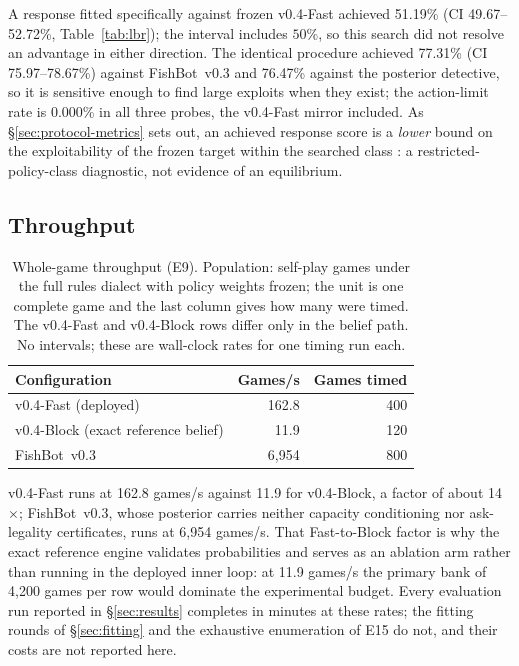 \documentclass[11pt]{article}
\theoremstyle{definition}
\DeclareRobustCommand{\vfast}{\texorpdfstring{\mbox{v0.4-Fast}}{v0.4-Fast}}
\DeclareRobustCommand{\vblock}{\texorpdfstring{\mbox{v0.4-Block}}{v0.4-Block}}
\DeclareRobustCommand{\vthree}{\texorpdfstring{\mbox{FishBot v0.3}}{FishBot v0.3}}
\newcommand{\numHtHGames}{4{,}200}
\newcommand{\numThroughputFast}{162.8}
\newcommand{\numThroughputBlock}{11.9}
\newcommand{\numThroughputThree}{6{,}954}
\newcommand{\numThroughputRatio}{14}
\newcommand{\numLBRFour}{51.19}
\newcommand{\numLBRFourCI}{49.67--52.72}
\newcommand{\numLBRThree}{77.31}
\newcommand{\numLBRThreeCI}{75.97--78.67}
\newcommand{\numLBRDetective}{76.47}
\newcommand{\numLBRLimit}{0.000\%}
\begin{document}
A response fitted specifically against frozen \vfast{} achieved \numLBRFour\% (CI
\numLBRFourCI\%, Table~\ref{tab:lbr}); the interval includes $50\%$, so this
search did not resolve an advantage in either direction. The identical procedure
achieved \numLBRThree\% (CI \numLBRThreeCI\%) against \vthree{} and
\numLBRDetective\% against the posterior detective, so it is sensitive enough to
find large exploits when they exist; the action-limit rate is \numLBRLimit{} in
all three probes, the \vfast{} mirror included. As \S\ref{sec:protocol-metrics}
sets out, an achieved response score is a \emph{lower} bound on the
exploitability of the frozen target within the searched class \cite{lisy-lbr}: a
restricted-policy-class diagnostic, not evidence of an equilibrium.

\subsection{Throughput}
\label{sec:throughput}

\begin{table}[!htbp]
\centering
\caption{Whole-game throughput (E9). Population: self-play games under the full
rules dialect with policy weights frozen; the unit is one complete game and the
last column gives how many were timed. The \vfast{} and \vblock{} rows differ
only in the belief path. No intervals; these are wall-clock rates for one timing
run each.}
\label{tab:throughput}
\small
\begin{tabular}{lrr}
\toprule
Configuration & Games/s & Games timed \\
\midrule
\vfast{} (deployed) & 162.8 & 400 \\
\vblock{} (exact reference belief) & 11.9 & 120 \\
\vthree{} & 6{,}954 & 800 \\
\bottomrule
\end{tabular}%
\end{table}

\vfast{} runs at \numThroughputFast{} games/s against \numThroughputBlock{} for
\vblock{}, a factor of about \numThroughputRatio$\times$; \vthree{}, whose
posterior carries neither capacity conditioning nor ask-legality certificates,
runs at \numThroughputThree{} games/s. That Fast-to-Block factor is why the exact
reference engine validates probabilities and serves as an ablation arm rather
than running in the deployed inner loop: at \numThroughputBlock{} games/s the
primary bank of \numHtHGames{} games per row would dominate the experimental
budget. Every evaluation run reported in \S\ref{sec:results} completes in
minutes at these rates; the fitting rounds of \S\ref{sec:fitting} and the
exhaustive enumeration of E15 do not, and their costs are not reported here.
\end{document}
